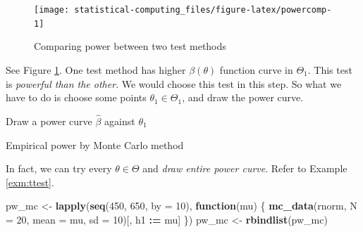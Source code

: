 \documentclass[]{book}
\newenvironment{Shaded}{\begin{snugshade}}{\end{snugshade}}
\newcommand{\ControlFlowTok}[1]{\textcolor[rgb]{0.13,0.29,0.53}{\textbf{#1}}}
\newcommand{\DataTypeTok}[1]{\textcolor[rgb]{0.13,0.29,0.53}{#1}}
\newcommand{\DecValTok}[1]{\textcolor[rgb]{0.00,0.00,0.81}{#1}}
\newcommand{\ErrorTok}[1]{\textcolor[rgb]{0.64,0.00,0.00}{\textbf{#1}}}
\newcommand{\KeywordTok}[1]{\textcolor[rgb]{0.13,0.29,0.53}{\textbf{#1}}}
\newcommand{\NormalTok}[1]{#1}
\newcommand{\OperatorTok}[1]{\textcolor[rgb]{0.81,0.36,0.00}{\textbf{#1}}}
\newcommand{\StringTok}[1]{\textcolor[rgb]{0.31,0.60,0.02}{#1}}
\theoremstyle{definition}
\theoremstyle{definition}
\theoremstyle{definition}
\theoremstyle{remark}
\begin{document}
\begin{figure}[H]

{\centering \texttt{[image: statistical-computing\_files/figure-latex/powercomp-1]} 

}

\caption{Comparing power between two test methods}\label{fig:powercomp}
\end{figure}

See Figure \ref{fig:powercomp}. One test method has higher \(\beta(\theta)\) function curve in \(\Theta_1\). This test is \emph{powerful than the other}. We would choose this test in this step. So what we have to do is choose some points \(\theta_1 \in \Theta_1\), and draw the power curve.

\begin{algorithm}[H] \label{alg:algpower}
  \SetAlgoLined
  Draw a power curve $\hat\beta$ against $\theta_1$
  \caption{Empirical power by Monte Carlo method}
\end{algorithm}

In fact, we can try every \(\theta \in \Theta\) and \emph{draw entire power curve}. Refer to Example \ref{exm:ttest}.

\begin{Shaded}
\begin{Highlighting}[]
\NormalTok{pw_mc <-}
\StringTok{  }\KeywordTok{lapply}\NormalTok{(}\KeywordTok{seq}\NormalTok{(}\DecValTok{450}\NormalTok{, }\DecValTok{650}\NormalTok{, }\DataTypeTok{by =} \DecValTok{10}\NormalTok{), }\ControlFlowTok{function}\NormalTok{(mu) \{}
    \KeywordTok{mc_data}\NormalTok{(rnorm, }\DataTypeTok{N =} \DecValTok{20}\NormalTok{, }\DataTypeTok{mean =}\NormalTok{ mu, }\DataTypeTok{sd =} \DecValTok{10}\NormalTok{)[,}
\NormalTok{                                               h1 }\OperatorTok{:}\ErrorTok{=}\StringTok{ }\NormalTok{mu]}
\NormalTok{  \})}
\NormalTok{pw_mc <-}\StringTok{ }\KeywordTok{rbindlist}\NormalTok{(pw_mc)}
\end{Highlighting}
\end{Shaded}
\end{document}
